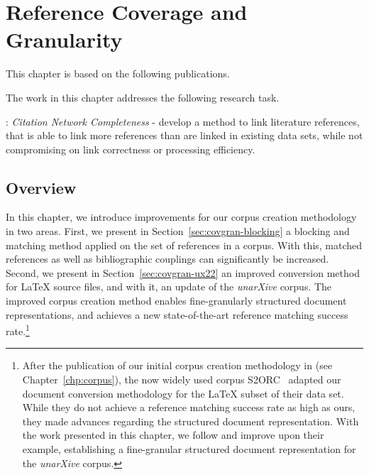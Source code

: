 \chapter{Reference Coverage and Granularity}
\label{chp:covgran}

This chapter is based on the following publications.
\begin{infobox-pub}
\end{infobox-pub}

\begin{infobox-pub}
\end{infobox-pub}

The work in this chapter addresses the following research task.

\begin{rtlist}
    \item[\rtmark{2}:] \textit{Citation Network Completeness} - develop a method to link literature references, that is able to link more references than are linked in existing data sets, while not compromising on link correctness or processing efficiency.
\end{rtlist}

\section{Overview}
In this chapter, we introduce improvements for our corpus creation methodology in two areas.
First, we present in Section~\ref{sec:covgran-blocking} a blocking and matching method applied on the set of references in a corpus. With this, matched references as well as bibliographic couplings can significantly be increased. %
Second, we present in Section~\ref{sec:covgran-ux22} an improved conversion method for \LaTeX{} source files, and with it, an update of the \emph{unarXive} corpus. The improved corpus creation method enables fine-granularly structured document representations, and achieves a new state-of-the-art reference matching success rate.\footnote{After the publication of our initial corpus creation methodology in \cite{Saier2020} (see Chapter~\ref{chp:corpus}), the now widely used corpus S2ORC~\cite{Lo2020} adapted our document conversion methodology for the \LaTeX{} subset of their data set. While they do not achieve a reference matching success rate as high as ours, they made advances regarding the structured document representation. With the work presented in this chapter, we follow and improve upon their example, establishing a fine-granular structured document representation for the \emph{unarXive} corpus.}

